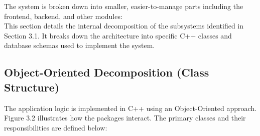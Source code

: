 \documentclass[letterpaper,12pt,oneside,listof=totoc,parskip=full]{scrreprt}
\begin{document}
The system is broken down into smaller, easier-to-manage parts including the frontend, backend, and other modules:\\







This section details the internal decomposition of the subsystems identified in Section 3.1. It breaks down the architecture into specific C++ classes and database schemas used to implement the system.

\subsection{Object-Oriented Decomposition (Class Structure)}
The application logic is implemented in C++ using an Object-Oriented approach. Figure 3.2 illustrates how the packages interact. The primary classes and their responsibilities are defined below:
\end{document}
